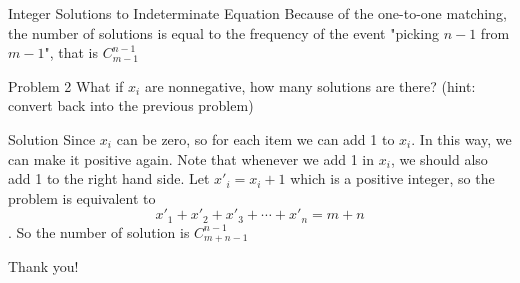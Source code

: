 \documentclass{beamer}
\begin{document}
\begin{frame}{Integer Solutions to Indeterminate Equation}
Because of the one-to-one matching, the number of solutions is equal to the frequency of the event "picking $n-1$ from $m-1$", that is $C_{m-1}^{n-1}$

\begin{block}{Problem 2}
What if $x_i$ are nonnegative, how many solutions are there? (hint: convert back into the previous problem)
\end{block}
\begin{block}{Solution}
Since $x_i$ can be zero, so for each item we can add 1 to $x_i$. In this way, we can make it positive again. Note that whenever we add 1 in $x_i$, we should also add 1 to the right hand side. Let $x'_i=x_i+1$ which is a positive integer, so the problem is equivalent to $$x'_1+x'_2+x'_3+\cdots+x'_n=m+n$$. So the number of solution is $C_{m+n-1}^{n-1}$
\end{block}
\end{frame}

\begin{frame}
\begin{center}
\huge Thank you!
\end{center}
\end{frame}
\end{document}
